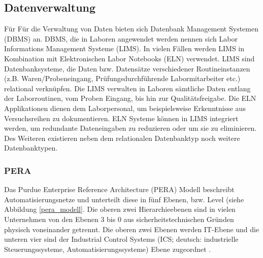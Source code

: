 \subsection{Datenverwaltung}

Für Für die Verwaltung von Daten bieten sich Datenbank Management Systemen (DBMS) an. DBMS, die in Laboren angewendet werden nennen sich Labor Informations Management Systeme (LIMS). In vielen Fällen werden LIMS in Kombination mit Elektronischen Labor Notebooks (ELN) verwendet. LIMS sind Datenbanksysteme, die Daten bzw. Datensätze verschiedener Routineinstanzen (z.B. Waren/Probeneingang, Prüfungsdurchführende Labormitarbeiter etc.) relational verknüpfen. Die LIMS verwalten in Laboren sämtliche Daten entlang der Laborroutinen, vom Proben Eingang, bis hin zur Qualitätsfreigabe. Die ELN Applikationen dienen dem Laborpersonal, um beispielsweise Erkenntnisse aus Versuchsreihen zu dokumentieren. ELN Systeme können in LIMS integriert werden, um redundante Dateneingaben zu reduzieren oder um sie zu eliminieren. Des Weiteren existieren neben dem relationalen Datenbanktyp noch weitere Datenbanktypen. \\

\subsubsection{PERA}

Das Purdue Enterprise Reference Architecture (PERA) Modell beschreibt Automatisierungsnetze und unterteilt diese in fünf Ebenen, bzw. \glqq Level\grqq{} (siehe  Abbildung \ref{pera_modell}. Die oberen zwei Hierarchieebenen sind in vielen Unternehmen von den Ebenen 3 bis 0 aus sicherheitstechnischen Gründen physisch voneinander getrennt. Die oberen zwei Ebenen werden IT-Ebene und die unteren vier sind der Industrial Control Systems (ICS; deutsch: industrielle Steuerungssysteme, Automatisierungssysteme) Ebene zugeordnet \cite{ics_kompendium}.

